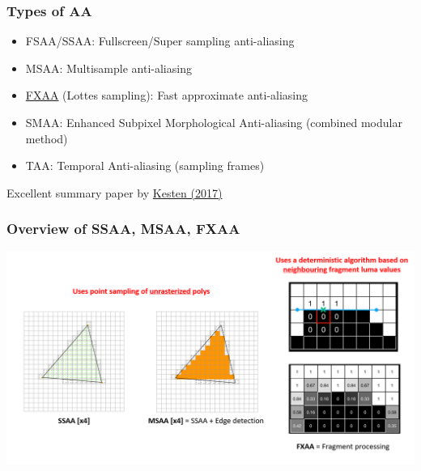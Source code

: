 \documentclass{beamer}
\begin{document}
\begin{frame}
    \frametitle{Types of AA}

    \begin{itemize}
        \item FSAA/SSAA: Fullscreen/Super sampling anti-aliasing
        \item MSAA: Multisample anti-aliasing
        \item \href{http://blog.simonrodriguez.fr/articles/2016/07/implementing_fxaa.html}{FXAA} (Lottes sampling): Fast approximate anti-aliasing
        \item SMAA: Enhanced Subpixel Morphological Anti-aliasing (combined modular method)
        \item TAA: Temporal Anti-aliasing (sampling frames)
    \end{itemize}

    Excellent summary paper by \href{https://kth.diva-portal.org/smash/get/diva2:1106244/FULLTEXT01.pdf}{Kesten (2017)}

\end{frame}

\begin{frame}
    \frametitle{Overview of SSAA, MSAA, FXAA}

    \begin{center}
        \includegraphics[scale=0.3]{images/antialiasing.png}
    \end{center}

\end{frame}
\end{document}
